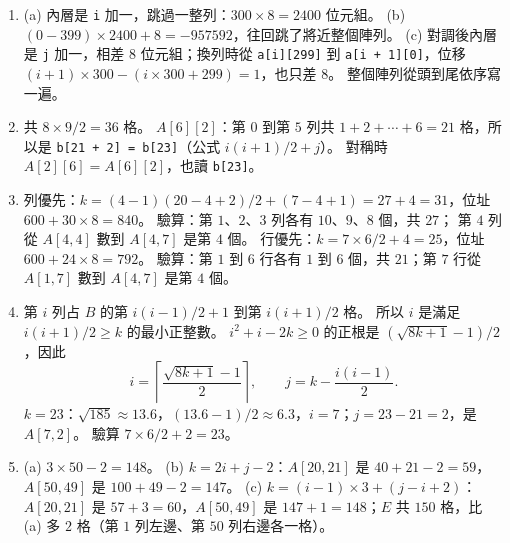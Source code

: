 \begin{enumerate}
\item (a) 內層是 \texttt{i} 加一，跳過一整列：$300 \times 8 = 2400$ 位元組。 (b)
$(0 - 399) \times 2400 + 8 = -957592$，往回跳了將近整個陣列。 (c) 對調後內層是
\texttt{j} 加一，相差 $8$ 位元組；換列時從 \texttt{a[i][299]} 到
\texttt{a[i + 1][0]}，位移 $(i + 1) \times 300 - (i \times 300 + 299) = 1$，也只差 $8$。
整個陣列從頭到尾依序寫一遍。

\item 共 $8 \times 9 / 2 = 36$ 格。 $A[6][2]$：第 $0$ 到第 $5$ 列共 $1 + 2 + \cdots + 6
= 21$ 格，所以是 \texttt{b[21 + 2] = b[23]}（公式 $i(i + 1)/2 + j$）。 對稱時
$A[2][6] = A[6][2]$，也讀 \texttt{b[23]}。

\item 列優先：$k = (4 - 1)(20 - 4 + 2)/2 + (7 - 4 + 1) = 27 + 4 = 31$，位址
$600 + 30 \times 8 = 840$。 驗算：第 $1$、$2$、$3$ 列各有 $10$、$9$、$8$ 個，共 $27$；
第 $4$ 列從 $A[4, 4]$ 數到 $A[4, 7]$ 是第 $4$ 個。 行優先：$k = 7 \times 6 / 2 + 4 =
25$，位址 $600 + 24 \times 8 = 792$。 驗算：第 $1$ 到 $6$ 行各有 $1$ 到 $6$ 個，共
$21$；第 $7$ 行從 $A[1, 7]$ 數到 $A[4, 7]$ 是第 $4$ 個。

\item 第 $i$ 列占 $B$ 的第 $i(i - 1)/2 + 1$ 到第 $i(i + 1)/2$ 格。 所以 $i$ 是滿足
$i(i + 1)/2 \ge k$ 的最小正整數。 $i^2 + i - 2k \ge 0$ 的正根是
$(\sqrt{8k + 1} - 1)/2$，因此
\[
i = \left\lceil \frac{\sqrt{8k + 1} - 1}{2} \right\rceil ,\qquad
j = k - \frac{i(i - 1)}{2} .
\]
$k = 23$：$\sqrt{185} \approx 13.6$，$(13.6 - 1)/2 \approx 6.3$，$i = 7$；$j = 23 - 21
= 2$，是 $A[7, 2]$。 驗算 $7 \times 6/2 + 2 = 23$。

\item (a) $3 \times 50 - 2 = 148$。 (b) $k = 2i + j - 2$：$A[20, 21]$ 是 $40 + 21 - 2 =
59$，$A[50, 49]$ 是 $100 + 49 - 2 = 147$。 (c) $k = (i - 1) \times 3 + (j - i + 2)$：
$A[20, 21]$ 是 $57 + 3 = 60$，$A[50, 49]$ 是 $147 + 1 = 148$；$E$ 共 $150$ 格，比
(a) 多 $2$ 格（第 $1$ 列左邊、第 $50$ 列右邊各一格）。


\end{enumerate}
